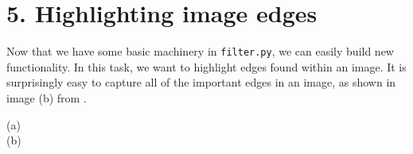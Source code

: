 \vspace{10mm}

\section{5. Highlighting image edges}

Now that we have some basic machinery in {\tt filter.py}, we can easily build new functionality. In this task, we want to highlight edges found within an image.  It is surprisingly easy to capture all of the important edges in an image, as shown in image (b) from . 

\begin{marginfigure}
\vspace{20mm}
\begin{center}
(a) \\
(b) 

\end{center}
\end{marginfigure}
